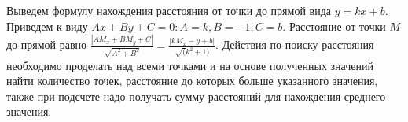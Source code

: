 \solutionSection

Выведем формулу нахождения расстояния от точки до прямой вида $y = kx + b$. Приведем к виду $Ax + By + C = 0: A = k, B = -1, C = b$.
Расстояние от точки $M$ до прямой равно $\frac{|AM_x + BM_y + C|}{\sqrt{A^2 + B^2}} = \frac{|kM_x-y+b|}{\sqrt(k^2 + 1)}$. Действия по поиску расстояния необходимо проделать над всеми точками и на основе полученных значений найти количество точек, расстояние до которых больше указанного значения, также при подсчете надо получать сумму расстояний для нахождения среднего значения. 
